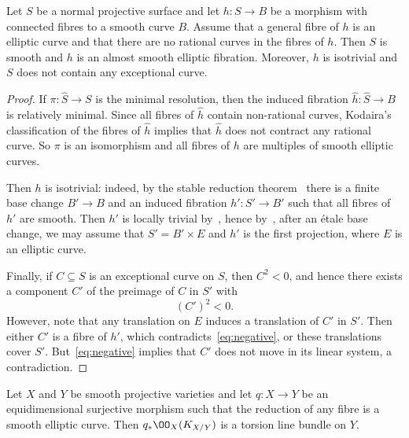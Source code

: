 \begin{lemm}\label{lem:surface}
Let $S$ be a normal projective surface and let $h\colon S \to B$ be a morphism with connected fibres to a smooth curve $B$. Assume that a general fibre of $h$ is an elliptic curve and that there are no rational curves in the fibres of $h$. Then $S$ is smooth and $h$ is an almost smooth elliptic fibration. Moreover, $h$ is isotrivial and $S$ does not contain any exceptional curve.
\end{lemm}

\begin{proof}
If $\pi\colon \widehat S \to S$ is the minimal resolution, then the induced fibration $\widehat h\colon \widehat S \to B$ is relatively minimal. Since all fibres of $\widehat h$ contain non-rational curves, Kodaira's classification of the fibres of $\widehat h$ implies that $\widehat h$ does not contract any rational curve. So $\pi$ is an isomorphism and all fibres of $h$ are multiples of smooth elliptic curves.

Then $h$ is isotrivial: indeed, by the stable reduction theorem~\cite{KKMS} there is a finite base change $B'\to B$ and an induced fibration $h'\colon S'\to B'$ such that all fibres of $h'$ are smooth. Then $h'$ is locally trivial by~\cite[Theorems~III.17.3 and III.18.2]{BHPV04}, hence by~\cite[Proposition~VI.8]{Bea96}, after an étale base change, we may assume that $S'=B'\times E$ and $h'$ is the first projection, where $E$ is an elliptic curve.

Finally, if $C\subseteq S$ is an exceptional curve on $S$, then $C^2<0$, and hence there exists a component $C'$ of the preimage of $C$ in $S'$ with
\begin{equation}\label{eq:negative}
(C')^2<0.
\end{equation}
However, note that any translation on $E$ induces a translation of $C'$ in $S'$. Then either $C'$ is a fibre of $h'$, which contradicts~\eqref{eq:negative}, or these translations cover $S'$. But~\eqref{eq:negative} implies that $C'$ does not move in its linear system, a contradiction.
\end{proof}


\begin{lemm}\label{lem:flat-elliptic-a}
Let $X$ and $Y$ be smooth projective varieties and let $q\colon X \to Y$ be an equidimensional surjective morphism such that the reduction of any fibre is a smooth elliptic curve. Then $q_*\OO_X(K_{X/Y})$ is a torsion line bundle on $Y$.
\end{lemm}

